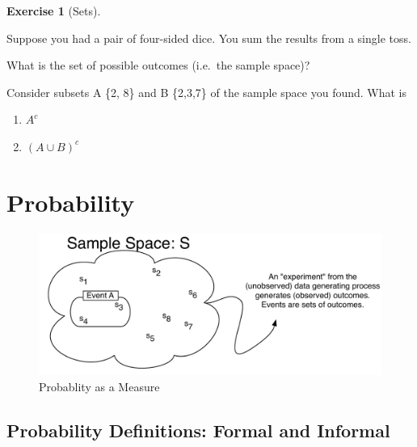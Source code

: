\documentclass[
]{book}
\providecommand{\tightlist}{%
  \setlength{\itemsep}{0pt}\setlength{\parskip}{0pt}}
\theoremstyle{definition}
\theoremstyle{definition}
\theoremstyle{definition}
\newtheorem{exercise}{Exercise}[chapter]
\theoremstyle{definition}
\theoremstyle{remark}
\begin{document}
\begin{exercise}[Sets]
\protect\hypertarget{exr:sets1}{}{\label{exr:sets1} {} }

Suppose you had a pair of four-sided dice. You sum the results from a single toss.

What is the set of possible outcomes (i.e.~the sample space)?

Consider subsets A \{2, 8\} and B \{2,3,7\} of the sample space you found. What is

\begin{enumerate}
\def\labelenumi{\arabic{enumi}.}
\tightlist
\item
  \(A^c\)
\item
  \((A \cup B)^c\)
\end{enumerate}
\end{exercise}

\hypertarget{probdef}{%
\section{Probability}\label{probdef}}

\begin{figure}
\centering
\includegraphics{images/probability.pdf}
\caption[\label{fig:prob-image}Probablity as a Measure]{\label{fig:prob-image}Probablity as a Measure\footnotemark{}}
\end{figure}

\hypertarget{probability-definitions-formal-and-informal}{%
\subsection*{Probability Definitions: Formal and Informal}\label{probability-definitions-formal-and-informal}}
\end{document}
